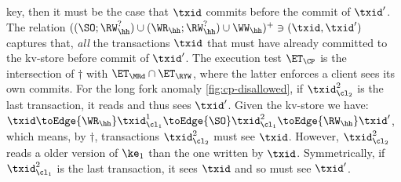 key, then it {must} be
the case that $\txid$ commits before the commit of $\txid'$.
The relation $((\SO ; \RW_{\hh}^{?}) \cup (\WR_{\hh} ; \RW_{\hh}^{?}) \cup \WW_\hh )^{+} \ni (\txid, \txid')$
captures that, {\em all} the transactions $\txid$ that {must} have already committed to the kv-store before commit of \( \txid' \).
The execution test $\ET_{\CP}$ is the intersection of $\dagger$ with $\ET_\MRd \cap \ET_\RYW$,
where the latter enforces a client sees its own commits.
For the long fork anomaly \cref{fig:cp-disallowed},
if \( \txid_{\cl_2}^2\) is the last transaction, it reads and thus sees \( \txid' \).
Given the kv-store we have:
\(
\txid \toEdge{\WR_\hh} \txid^1_{\cl_1} \toEdge{\SO} \txid^2_{\cl_1} \toEdge{\RW_\hh} \txid'
\),
which means, by \( \dagger \), transactions \( \txid_{\cl_2}^2 \) must see \( \txid \).
However, \(  \txid_{\cl_2}^2 \) reads a older version of \( \ke_1 \) than the one written by \( \txid \).
Symmetrically,
if \( \txid_{\cl_1}^2\) is the last transaction, it sees \( \txid \) and so must see \( \txid' \).

